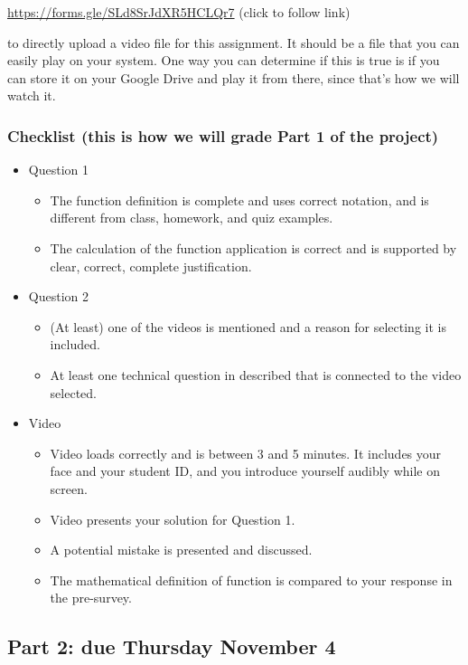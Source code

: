 \url{https://forms.gle/SLd8SrJdXR5HCLQr7}  (click to follow link) 

to directly upload a video file for this assignment.
It should be a file that you can easily play on your system. 
One way you can determine if this is true is if you can store it on your Google Drive and play it from there,
since that's how we will watch it.

\subsubsection*{Checklist (this is how we will grade Part 1 of the project)}
\begin{itemize}
\item Question 1
    \begin{itemize}
        \item The function definition is complete and uses correct notation, 
        and is different from class, homework, and quiz examples.
        \item The calculation of the function application is correct and is 
        supported by clear, correct, complete justification.
    \end{itemize}
\item Question 2
    \begin{itemize}
        \item (At least) one of the videos is mentioned and a reason for selecting it is included.
        \item At least one technical question in described that is connected to the video selected.
    \end{itemize}
\item Video
    \begin{itemize}
        \item Video loads correctly and is between 3 and 5 minutes. It includes your face and your student ID, 
        and you introduce yourself audibly while on screen.
        \item Video presents your solution for Question 1.
        \item A potential mistake is presented and discussed.
        \item The mathematical definition of function is compared to your response in the pre-survey.
    \end{itemize}
\end{itemize}

\newpage
\subsection*{Part 2: due Thursday November 4}
